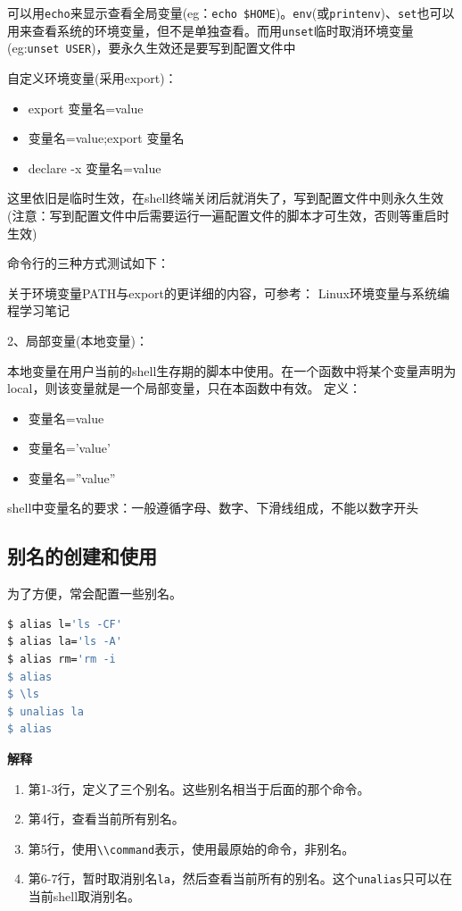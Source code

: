 \documentclass[doctor,openright,twoside]{sjtuthesis}
\providecommand{\tightlist}{%
    \setlength{\itemsep}{0pt}\setlength{\parskip}{0pt}}
\newcommand{\passthrough}[1]{#1}
\theoremstyle{plain}
\theoremstyle{definition}
\theoremstyle{remark}
\theoremstyle{ocrenumbox}
\theoremstyle{plain}
\begin{document}
可以用\passthrough{\lstinline!echo!}来显示查看全局变量(eg：\passthrough{\lstinline!echo $HOME!})。\passthrough{\lstinline!env!}(或\passthrough{\lstinline!printenv!})、\passthrough{\lstinline!set!}也可以用来查看系统的环境变量，但不是单独查看。而用\passthrough{\lstinline!unset!}临时取消环境变量(eg:\passthrough{\lstinline!unset USER!})，要永久生效还是要写到配置文件中

自定义环境变量(采用export)：

\begin{itemize}
\tightlist
\item
  export 变量名=value
\item
  变量名=value;export 变量名
\item
  declare -x 变量名=value
\end{itemize}

这里依旧是临时生效，在shell终端关闭后就消失了，写到配置文件中则永久生效(注意：写到配置文件中后需要运行一遍配置文件的脚本才可生效，否则等重启时生效)

命令行的三种方式测试如下：

关于环境变量PATH与export的更详细的内容，可参考： Linux环境变量与系统编程学习笔记

2、局部变量(本地变量)：

本地变量在用户当前的shell生存期的脚本中使用。在一个函数中将某个变量声明为local，则该变量就是一个局部变量，只在本函数中有效。
定义：

\begin{itemize}
\tightlist
\item
  变量名=value
\item
  变量名='value'
\item
  变量名=''value''
\end{itemize}

shell中变量名的要求：一般遵循字母、数字、下滑线组成，不能以数字开头

\hypertarget{section-55}{%
\subsection{别名的创建和使用}\label{section-55}}

为了方便，常会配置一些别名。

\begin{lstlisting}[language=bash]
$ alias l='ls -CF'
$ alias la='ls -A'
$ alias rm='rm -i
$ alias
$ \ls
$ unalias la
$ alias
\end{lstlisting}

\textbf{解释}

\begin{enumerate}
\def\labelenumi{\arabic{enumi}.}
\tightlist
\item
  第1-3行，定义了三个别名。这些别名相当于后面的那个命令。
\item
  第4行，查看当前所有别名。
\item
  第5行，使用\passthrough{\lstinline!\\command!}表示，使用最原始的命令，非别名。
\item
  第6-7行，暂时取消别名\passthrough{\lstinline!la!}，然后查看当前所有的别名。这个\passthrough{\lstinline!unalias!}只可以在当前shell取消别名。
\end{enumerate}
\end{document}
